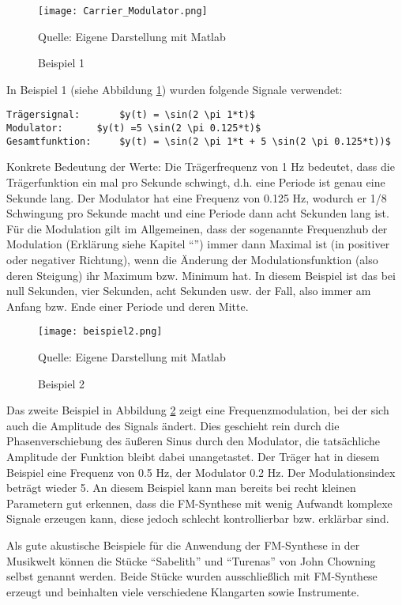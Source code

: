 \begin{figure} [ht]
\centering
  \texttt{[image: Carrier\_Modulator.png]}
\caption{Beispiel 1}
\label{fig:beispiel1}
Quelle: Eigene Darstellung mit Matlab
\end{figure}

In Beispiel 1 (siehe Abbildung \ref{fig:beispiel1})  wurden folgende Signale verwendet:

\begin{lstlisting}[mathescape]
Trägersignal: 		$y(t) = \sin(2 \pi 1*t)$
Modulator:		$y(t) =5 \sin(2 \pi 0.125*t)$
Gesamtfunktion: 	$y(t) = \sin(2 \pi 1*t + 5 \sin(2 \pi 0.125*t))$
\end{lstlisting}

Konkrete Bedeutung der Werte: Die Trägerfrequenz von 1 Hz bedeutet, dass die Trägerfunktion ein mal pro Sekunde schwingt, d.h. eine Periode ist genau eine Sekunde lang. Der Modulator hat eine Frequenz von 0.125 Hz, wodurch er 1/8 Schwingung pro Sekunde macht und eine Periode dann acht Sekunden lang ist. Für die Modulation gilt im Allgemeinen, dass der sogenannte Frequenzhub der Modulation (Erklärung siehe Kapitel ``'') immer dann Maximal ist (in positiver oder negativer Richtung), wenn die Änderung der Modulationsfunktion (also deren Steigung) ihr Maximum bzw. Minimum hat. In diesem Beispiel ist das bei null Sekunden, vier Sekunden, acht Sekunden usw. der Fall, also immer am Anfang bzw. Ende einer Periode und deren Mitte.

\begin{figure} [ht]
\centering
  \texttt{[image: beispiel2.png]}
\caption{Beispiel 2}
\label{fig:beispiel2}
Quelle: Eigene Darstellung mit Matlab
\end{figure}

Das zweite Beispiel in Abbildung \ref{fig:beispiel2} zeigt eine Frequenzmodulation, bei der sich auch die Amplitude des Signals ändert. Dies geschieht rein durch die Phasenverschiebung des äußeren Sinus durch den Modulator, die tatsächliche Amplitude der Funktion bleibt dabei unangetastet. Der Träger hat in diesem Beispiel eine Frequenz von 0.5 Hz, der Modulator 0.2 Hz. Der Modulationsindex beträgt wieder 5. An diesem Beispiel kann man bereits bei recht kleinen Parametern gut erkennen, dass die FM-Synthese mit wenig Aufwandt komplexe Signale erzeugen kann, diese jedoch schlecht kontrollierbar bzw. erklärbar sind.

Als gute akustische Beispiele für die Anwendung der FM-Synthese in der Musikwelt können die Stücke ``Sabelith'' und ``Turenas'' von John Chowning selbst genannt werden. Beide Stücke wurden ausschließlich mit FM-Synthese erzeugt und beinhalten viele verschiedene Klangarten sowie Instrumente.

